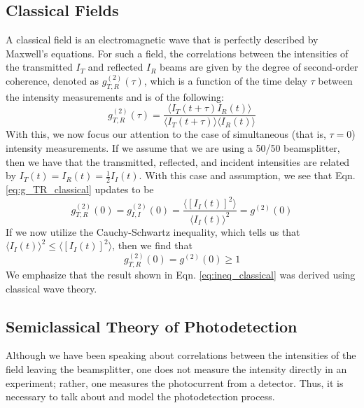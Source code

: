 \documentclass[twocolumn,amsmath,amssymb,pra]{revtex4-2}
\begin{document}
\subsection{Classical Fields}
A classical field is an electromagnetic wave that is perfectly described by Maxwell's equations. For such a field, the correlations between the intensities of the transmitted $I_{T}$ and reflected $I_{R}$ beams are given by the degree of second-order coherence, denoted as $g_{T, R}^{( 2 )} (\tau)$, which is a function of the time delay $\tau$ between the intensity measurements and is of the following:
\begin{equation}
    g_{T, R}^{( 2 )} (\tau)
    =
    \frac{ \langle I_{T}( t + \tau ) I_{R}( t ) \rangle }
    { \langle I_{T}( t + \tau ) \rangle \langle I_{R}( t ) \rangle }
    \label{eq:g_TR_classical}
\end{equation}
With this, we now focus our attention to the case of simultaneous (that is, $\tau = 0$) intensity measurements. If we assume that we are using a 50/50 beamsplitter, then we have that the transmitted, reflected, and incident intensities are related by $I_{T}(t) = I_{R}(t) = \frac{1}{2} I_{I}(t)$. With this case and assumption, we see that Eqn. \ref{eq:g_TR_classical} updates to be 
\begin{equation}
    g_{T, R}^{( 2 )} (0)
    =
    g_{I, I}^{( 2 )} (0)
    =
    \frac{ \langle [ I_{I}(t) ]^{2} \rangle }
    { \langle I_{I}(t) \rangle^{2} }
    =
    g^{( 2 )} (0)
    \label{eq:g_classical}
\end{equation}
If we now utilize the Cauchy-Schwartz inequality, which tells us that $\langle I_{I}(t) \rangle^{2} \leq \langle [ I_{I}(t) ]^{2} \rangle$, then we find that 
\begin{equation}
    g_{T, R}^{( 2 )} (0)
    =
    g^{( 2 )} (0) 
    \geq 1
    \label{eq:ineq_classical}
\end{equation}
We emphasize that the result shown in Eqn. \ref{eq:ineq_classical} was derived using classical wave theory.

\subsection{Semiclassical Theory of Photodetection}
Although we have been speaking about correlations between the intensities of the field leaving the beamsplitter, one does not measure the intensity directly in an experiment; rather, one measures the photocurrent from a detector. Thus, it is necessary to talk about and model the photodetection process.
\end{document}
